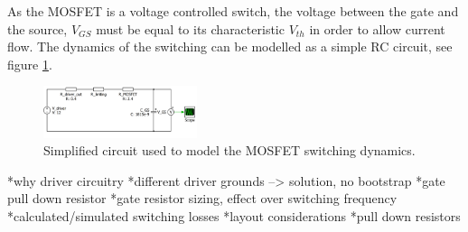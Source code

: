 As the MOSFET is a voltage controlled switch, the voltage between the gate and the source, $V_{GS}$ must be equal to its characteristic $V_{th}$ in order to allow current flow. The dynamics of the switching can be modelled as a simple RC circuit, see figure \ref{mosfet_rc_gate}.


\begin{figure}[htbp]
	\begin{center}
		\includegraphics[width=0.4\textwidth]{../Pictures/P1/driver_resistor_sizing.png}
		\caption{Simplified circuit used to model the MOSFET switching dynamics.}
		\label{mosfet_rc_gate}
	\end{center}	
\end{figure}



*why driver circuitry
*different driver grounds --> solution, no bootstrap
*gate pull down resistor
*gate resistor sizing, effect over switching frequency 
*calculated/simulated switching losses
*layout considerations
*pull down resistors

